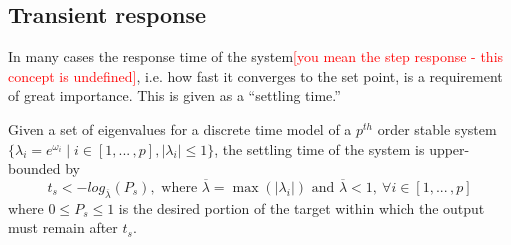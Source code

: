 \documentclass[sigconf]{llncs}
\newcommand{\mat}[1]{{#1}}
\renewcommand{\vec}[1]{{#1}}
\renewcommand{\note}[1]{\textcolor{red}{[#1]}}
\begin{document}

\subsection{Transient response} 
\label{sec:transientspecification}
In many cases the response time of the system\note{you mean the step response - this concept is undefined}, i.e. how fast it converges to the set point, is a requirement of great importance. 
This is given as a ``settling time.'' 
 
\begin{theorem}
Given a set of eigenvalues for a discrete time model of a $p^{th}$ order stable system $\{\lambda_i =e^{\omega_i} \mid i \in [1, ...\,,p], |\lambda_i| \leq 1 \}$, the settling time of the system is upper-bounded by
\begin{equation}
t_s<-log_{\overline{\lambda}}({P_s}), \text{ where }  \overline{\lambda} = \max(|\lambda_i|) \text{ and } \overline{\lambda}<1,\ \forall i \in [1, ...\,,p]
\label{eq:set_time}
\end{equation}
where $0\leq P_s \leq 1$ is the desired portion of the target within which the output must remain after $t_s$.
\end{theorem}
\end{document}
